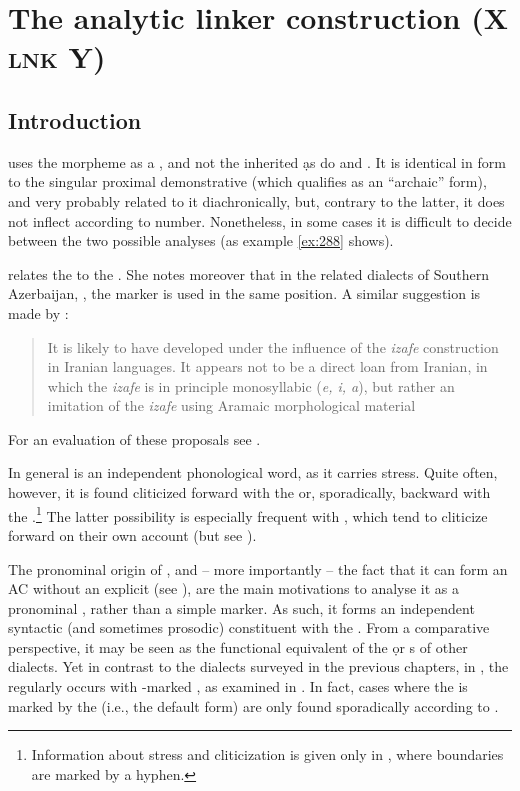 \section{The analytic linker construction (X \textsc{lnk} Y)} \label{ss:JUrm_Lnk}
\subsection{Introduction}
\JUrm uses the morpheme   as a \lnk*, and not the inherited \d as do \JZax and \Qar. It is identical in form to the singular proximal demonstrative   (which \cite[58]{GarbellUrmi} qualifies as an \enquote{archaic} form), and very probably related to it diachronically, but, contrary to the latter, it does not inflect according to number. Nonetheless, in some cases it is difficult to decide between the two possible analyses (as example \vref{ex:288} shows). 

\citet[171]{Garbell1965impact} relates the \lnk* {} to the . She notes moreover that in the related dialects of Southern  Azerbaijan, \Sol, the \Sor  marker  is used in the same position. A similar suggestion is made by \citet[176]{KhanUrmi}: \blockquote{It is likely to have developed under the influence of the \textit{izafe} construction in Iranian languages. It appears not to be a direct loan from Iranian, in which the \textit{izafe} is in principle monosyllabic (\textit{e, i, a}), but rather an imitation of the \textit{izafe} using Aramaic morphological material}. For an evaluation of these proposals see .  

In general  is an independent phonological word, as it carries stress. Quite often, however, it is found cliticized forward with the \secn or, sporadically, backward with the \prim.\footnote{Information about stress and cliticization is given only in \citet{KhanUrmi}, where  boundaries are marked by a hyphen.} The latter possibility is especially frequent with  \prims, which tend to cliticize forward on their own account (but see ). 

The pronominal origin of , and -- more importantly -- the fact that it can form an AC without an explicit \prim (see ), are the main motivations to analyse it as a pronominal \lnk*, rather than  a simple \secn marker. As such, it forms an independent syntactic (and sometimes prosodic) constituent with the \secn. From a comparative perspective, it may be seen as the functional equivalent of the \d or  \lnk*s of other dialects. Yet  in contrast to the dialects surveyed in the previous chapters, in \JUrm, the \lnk* regularly occurs with \cst-marked \prims, as examined in . In fact, cases where the \prim is marked by the \free* (i.e., the default form) are only found 
sporadically according to \citet[175]{KhanUrmi}. 








